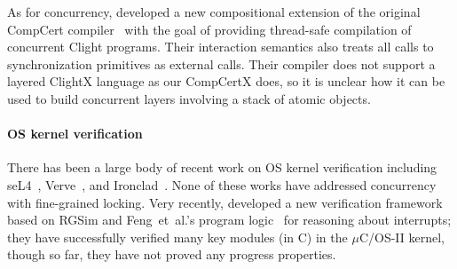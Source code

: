 As for concurrency, \citet{stewart15} developed a new compositional extension of the
original CompCert compiler~\cite{compcert} with the goal of providing
thread-safe compilation of concurrent Clight programs.  Their
interaction semantics also treats all calls to synchronization
primitives as external calls. Their compiler does not support a layered
ClightX language as our CompCertX does, so it is unclear how it can
be used to build concurrent layers involving a stack of atomic objects.

%
% 
%
%
% 
%
%
%
\paragraph{OS kernel verification} There has been a large body
of recent work on OS kernel verification including
seL4~\cite{klein2009sel4,klein14}, Verve~\cite{hawblitzel10},
and Ironclad~\cite{ironclad14}. None of these works have addressed  concurrency with fine-grained locking. Very recently,
\citet{xu16} developed a new verification framework based on RGSim
and Feng~{et~al.}'s program logic~\cite{feng08:aim} for reasoning
about interrupts; they have successfully verified many key modules
(in C) in the $\mu$C/OS-II kernel, though so far, they have not proved
any progress properties.


